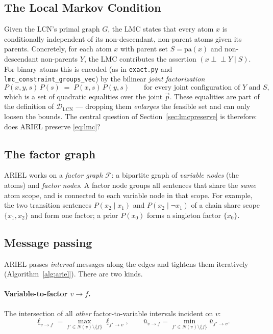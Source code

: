 \documentclass[11pt]{article}
\newcommand{\lo}{\underline}
\newcommand{\hi}{\overline}
\newcommand{\indep}{\perp\!\!\!\perp}
\begin{document}
\subsection{The Local Markov Condition}\label{sec:lmc}
Given the LCN's primal graph $G$, the LMC states that every atom $x$ is conditionally independent of
its non-descendant, non-parent atoms given its parents. Concretely, for each atom $x$ with parent
set $S=\mathrm{pa}(x)$ and non-descendant non-parents $Y$, the LMC contributes the assertion
$(x\indep Y\mid S)$. For binary atoms this is encoded (as in \texttt{exact.py} and
\texttt{lmc\_constraint\_groups\_vec}) by the bilinear \emph{joint factorization}
\begin{equation}\label{eq:lmc}
  P(x,y,s)\,P(s) \;=\; P(x,s)\,P(y,s)
  \qquad\text{for every joint configuration of }Y\text{ and }S,
\end{equation}
which is a set of quadratic equalities over the joint $\vec p$. These equalities are part of the
definition of $\mathcal D_{\mathrm{LCN}}$ --- dropping them \emph{enlarges} the feasible set and can
only loosen the bounds. The central question of Section~\ref{sec:lmcpreserve} is therefore: does
ARIEL preserve \eqref{eq:lmc}?

\subsection{The factor graph}
ARIEL works on a \emph{factor graph} $\mathcal F$: a bipartite graph of \emph{variable nodes} (the
atoms) and \emph{factor nodes}. A factor node groups all sentences that share the \emph{same} atom
scope, and is connected to each variable node in that scope. For example, the two transition
sentences $P(x_2\mid x_1)$ and $P(x_2\mid\neg x_1)$ of a chain share scope $\{x_1,x_2\}$ and form
one factor; a prior $P(x_0)$ forms a singleton factor $\{x_0\}$.

\subsection{Message passing}
ARIEL passes \emph{interval} messages along the edges and tightens them iteratively
(Algorithm~\ref{alg:ariel}). There are two kinds.

\paragraph{Variable-to-factor $v\!\to\!f$.} The intersection of all \emph{other}
factor-to-variable intervals incident on $v$:
\[
  \lo\ell_{v\to f}=\max_{f'\in N(v)\setminus\{f\}}\lo\ell_{f'\to v},\qquad
  \hi u_{v\to f}=\min_{f'\in N(v)\setminus\{f\}}\hi u_{f'\to v}.
\]
\end{document}
